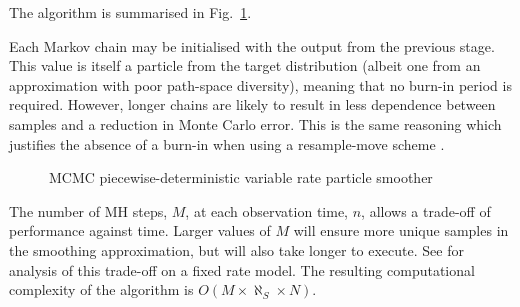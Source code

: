 \documentclass[peerreview,11pt,draftcls,onecolumn]{IEEEtran}
\begin{document}
The algorithm is summarised in Fig.~\ref{alg:VRPS}.

Each Markov chain may be initialised with the output from the previous stage. This value is itself a particle from the target distribution (albeit one from an approximation with poor path-space diversity), meaning that no burn-in period is required. However, longer chains are likely to result in less dependence between samples and a reduction in Monte Carlo error. This is the same reasoning which justifies the absence of a burn-in when using a resample-move scheme \cite{Gilks2001}.

\begin{figure}
\caption{MCMC piecewise-deterministic variable rate particle smoother}
\label{alg:VRPS}
\end{figure}

The number of MH steps, $M$, at each observation time, $n$, allows a trade-off of performance against time. Larger values of $M$ will ensure more unique samples in the smoothing approximation, but will also take longer to execute. See \cite{Bunch2012} for analysis of this trade-off on a fixed rate model. The resulting computational complexity of the algorithm is $O(M \times \aleph_S \times N)$.
\end{document}
